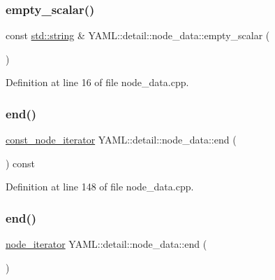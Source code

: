 \subsubsection{\texorpdfstring{empty\_scalar()}{empty\_scalar()}}
{\footnotesize\ttfamily const \mbox{\hyperlink{glad_8h_ac83513893df92266f79a515488701770}{std\+::string}} \& Y\+A\+M\+L\+::detail\+::node\+\_\+data\+::empty\+\_\+scalar (\begin{DoxyParamCaption}{ }\end{DoxyParamCaption})\hspace{0.3cm}{\ttfamily [static]}}



Definition at line 16 of file node\+\_\+data.\+cpp.

\mbox{\label{class_y_a_m_l_1_1detail_1_1node__data_a426ba063be0b0ad4e5a590f966b200b6}} 
\subsubsection{\texorpdfstring{end()}{end()}\hspace{0.1cm}{\footnotesize\ttfamily [1/2]}}
{\footnotesize\ttfamily \mbox{\hyperlink{namespace_y_a_m_l_1_1detail_a049af8e269401cbe1e735033914e4356}{const\+\_\+node\+\_\+iterator}} Y\+A\+M\+L\+::detail\+::node\+\_\+data\+::end (\begin{DoxyParamCaption}{ }\end{DoxyParamCaption}) const}



Definition at line 148 of file node\+\_\+data.\+cpp.

\mbox{\label{class_y_a_m_l_1_1detail_1_1node__data_a6afbee969af24854ba720d5f97927e19}} 
\subsubsection{\texorpdfstring{end()}{end()}\hspace{0.1cm}{\footnotesize\ttfamily [2/2]}}
{\footnotesize\ttfamily \mbox{\hyperlink{namespace_y_a_m_l_1_1detail_aa2a961156810d41a3b6744c10186afac}{node\+\_\+iterator}} Y\+A\+M\+L\+::detail\+::node\+\_\+data\+::end (\begin{DoxyParamCaption}{ }\end{DoxyParamCaption})}



